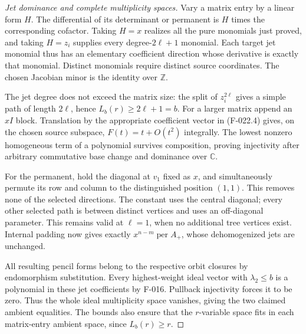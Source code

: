 \begin{proof}[Jet dominance and complete multiplicity spaces]
Vary a matrix entry by a linear form \(H\). The differential
of its determinant or permanent is \(H\) times the
corresponding cofactor. Taking \(H=x\) realizes all the
pure monomials just proved, and taking \(H=z_i\) supplies
every degree-\(2\ell+1\) monomial. Each target jet monomial
thus has an elementary coefficient direction whose derivative
is exactly that monomial. Distinct monomials require distinct
source coordinates. The chosen Jacobian minor is the identity
over \(\mathbb Z\).

The jet degree does not exceed the matrix size: the split
of \(z_i^{2\ell}\) gives a simple path of length
\(2\ell\), hence \(L_b(r)\geq2\ell+1=b\).
For a larger matrix append an \(xI\) block. Translation
by the appropriate coefficient vector in (F-022.4) gives,
on the chosen source subspace, \(F(t)=t+O(t^2)\)
integrally. The lowest nonzero homogeneous term of a
polynomial survives composition, proving injectivity after
arbitrary commutative base change and dominance over
\(\mathbb C\).

For the permanent, hold the diagonal at \(v_1\) fixed
as \(x\), and simultaneously permute its row and column
to the distinguished position \((1,1)\). This removes
none of the selected directions. The constant uses the
central diagonal; every other selected path is between
distinct vertices and uses an off-diagonal parameter.
This remains valid at \(\ell=1\), when no additional
tree vertices exist. Internal padding now gives exactly
\(x^{n-m}\operatorname{per}A_+\), whose dehomogenized
jets are unchanged.

All resulting pencil forms belong to the respective orbit
closures by endomorphism substitution. Every highest-weight
ideal vector with \(\lambda_2\leq b\) is a polynomial
in these jet coefficients by F-016. Pullback injectivity
forces it to be zero. Thus the whole ideal multiplicity
space vanishes, giving the two claimed ambient equalities.
The bounds also ensure that the \(r\)-variable space
fits in each matrix-entry ambient space, since \(L_b(r)\geq r\).
\end{proof}

